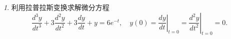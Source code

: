 \documentclass[11pt]{article}
\theoremstyle{remark}
\newtheorem{problem}{}
\begin{document}
\begin{problem}
    利用拉普拉斯变换求解微分方程
    $$
      \frac{d^3 y}{d t^3}+3 \frac{d^2 y}{d t^2}+3 \frac{d y}{d t}+y=6 e^{-t}, 
      \quad y(0)=\left.\frac{d y}{d t}\right|_{t=0}=\left.\frac{d^2 y}{d t^2}\right|_{t=0}=0 .
    $$
\end{problem}
  



  
  
    



\end{document}
